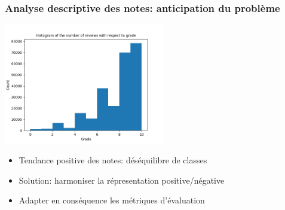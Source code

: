 \documentclass{beamer}
\begin{document}
\begin{frame}
\frametitle{Analyse descriptive des notes: anticipation du problème}

\centering
\includegraphics[width=7cm]{hist_plot_count.png}

\begin{itemize}
  \item Tendance positive des notes: déséquilibre de classes
  \item Solution: harmoniser la répresentation positive/négative
  \item Adapter en conséquence les métriques d'évaluation 
\end{itemize}
\end{frame}




\end{document}

